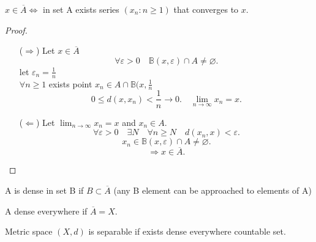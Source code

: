 \begin{theorem}
    $x \in \overline{A} \iff$ in set A exists series $\left( x_n : n \geq 1 \right) $ that converges to $x$.
\end{theorem}
\begin{proof}
    \begin{itemize}
        \item[($\Rightarrow$)] Let $x\in \overline{A}$
            \[
            \forall \varepsilon > 0 \quad \mathbb{B}(x, \varepsilon) \cap A \not= \varnothing
            .\] 
            let $\varepsilon_n = \frac{1}{n} \quad$ \\
            $\forall n \geq 1$ exists point $x_n \in A \cap \mathbb{B}(x, \frac{1}{n}$ \\
            \[
            0 \leq d(x, x_n) < \frac{1}{n} \to 0. \quad \lim_{n \to \infty} x_n = x
            .\] 
        \item[($\Leftarrow$)] Let $\lim_{n \to \infty} x_n = x$ and $x_n \in A$. \\
            \[
            \forall \varepsilon > 0 \quad \exists N \quad \forall n \geq N \quad d(x_n ,x) < \varepsilon
            .\] 
            \[
            x_n \in \mathbb{B}(x, \varepsilon) \cap A \not= \varnothing
            .\] 
            \[
            \Rightarrow x \in \overline{A}
            .\] 
    \end{itemize}
\end{proof}

\begin{definition}
    A is dense in set B if $B \subset \overline{A}$ (any B element can be approached to elements of A)
\end{definition}
\begin{definition}
    A dense everywhere if $\overline{A} = X$.
\end{definition}
\begin{definition}
    Metric space $\left( X, d \right) $ is separable if exists dense everywhere countable set.
\end{definition}

